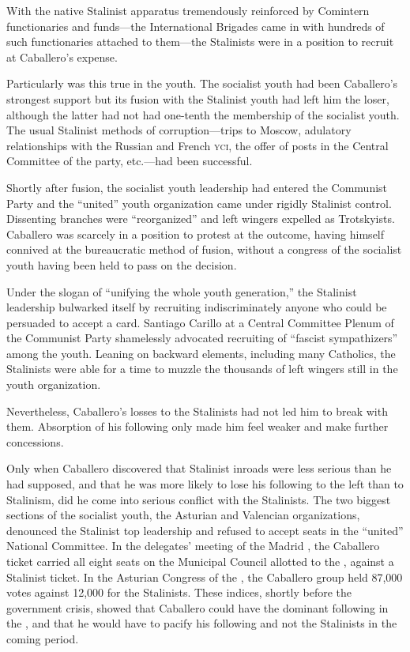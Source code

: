 With the native Stalinist apparatus tremendously reinforced by Comintern functionaries and funds---the International Brigades came in with hundreds of such functionaries attached to them---the Stalinists were in a position to recruit at Caballero’s expense.

Particularly was this true in the youth. The socialist youth had been Caballero’s strongest support but its fusion with the Stalinist youth had left him the loser, although the latter had not had one-tenth the membership of the socialist youth. The usual Stalinist methods of corruption---trips to Moscow, adulatory relationships with the Russian and French \textsc{yci}, the offer of posts in the Central Committee of the party, etc.---had been successful.

Shortly after fusion, the socialist youth leadership had entered the Communist Party and the ``united'' youth organization came under rigidly Stalinist control. Dissenting branches were ``reorganized'' and left wingers expelled as Trotskyists. Caballero was scarcely in a position to protest at the outcome, having himself connived at the bureaucratic method of fusion, without a congress of the socialist youth having been held to pass on the decision.

Under the slogan of ``unifying the whole youth generation,'' the Stalinist leadership bulwarked itself by recruiting indiscriminately anyone who could be persuaded to accept a card. Santiago Carillo at a Central Committee Plenum of the Communist Party shamelessly advocated recruiting of ``fascist sympathizers'' among the youth. Leaning on backward elements, including many Catholics, the Stalinists were able for a time to muzzle the thousands of left wingers still in the youth organization.

Nevertheless, Caballero’s losses to the Stalinists had not led him to break with them. Absorption of his following only made him feel weaker and make further concessions.

Only when Caballero discovered that Stalinist inroads were less serious than he had supposed, and that he was more likely to lose his following to the left than to Stalinism, did he come into serious conflict with the Stalinists. The two biggest sections of the socialist youth, the Asturian and Valencian organizations, denounced the Stalinist top leadership and refused to accept seats in the ``united'' National Committee. In the delegates’ meeting of the Madrid \UGT, the Caballero ticket carried all eight seats on the Municipal Council allotted to the \UGT, against a Stalinist ticket. In the Asturian Congress of the \UGT, the Caballero group held 87,000 votes against 12,000 for the Stalinists. These indices, shortly before the government crisis, showed that Caballero could have the dominant following in the \UGT, and that he would have to pacify his following and not the Stalinists in the coming period.

